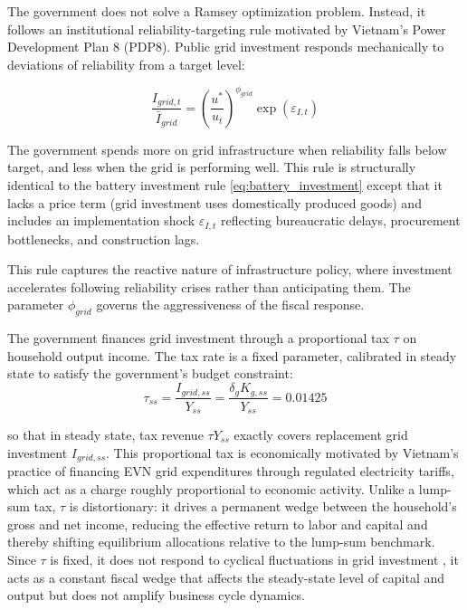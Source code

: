 \documentclass[12pt, a4paper]{article}
\begin{document}
	The government does not solve a Ramsey optimization problem. Instead, it follows an institutional reliability-targeting rule motivated by Vietnam's Power Development Plan 8 (PDP8). Public grid investment responds mechanically to deviations of reliability from a target level:
	
	\begin{equation}
		\frac{I_{grid,t}}{\bar{I}_{grid}} =
		\left(\frac{u^*}{u_t}\right)^{\phi_{grid}}
		\exp(\varepsilon_{I,t})
		\label{eq:grid_investment_rule}
	\end{equation}
	
	The government spends more on grid infrastructure when reliability falls below target, and less when the grid is performing well. This rule is structurally identical to the battery investment rule \eqref{eq:battery_investment} except that it lacks a price term (grid investment uses domestically produced goods) and includes an implementation shock $\varepsilon_{I,t}$ reflecting bureaucratic delays, procurement bottlenecks, and construction lags.
	
	This rule captures the reactive nature of infrastructure policy, where investment accelerates following reliability crises rather than anticipating them. The parameter $\phi_{grid}$ governs the aggressiveness of the fiscal response.
	
	The government finances grid investment through a proportional tax $\tau$ on household output income. The tax rate is a fixed parameter, calibrated in steady state to satisfy the government's budget constraint:
	\begin{equation}
		\tau_{ss} = \frac{I_{grid,ss}}{Y_{ss}} = \frac{\delta_g K_{g,ss}}{Y_{ss}} = 0.01425
\label{eq:gov_budget}
	\end{equation}
	
	\noindent so that in steady state, tax revenue $\tau Y_{ss}$ exactly covers replacement grid investment $I_{grid,ss}$. This proportional tax is economically motivated by Vietnam's practice of financing EVN grid expenditures through regulated electricity tariffs, which act as a charge roughly proportional to economic activity. Unlike a lump-sum tax, $\tau$ is distortionary: it drives a permanent wedge between the household's gross and net income, reducing the effective return to labor and capital and thereby shifting equilibrium allocations relative to the lump-sum benchmark. Since $\tau$ is fixed, it does not respond to cyclical fluctuations in grid investment ,  it acts as a constant fiscal wedge that affects the steady-state level of capital and output but does not amplify business cycle dynamics.
	
\end{document}
